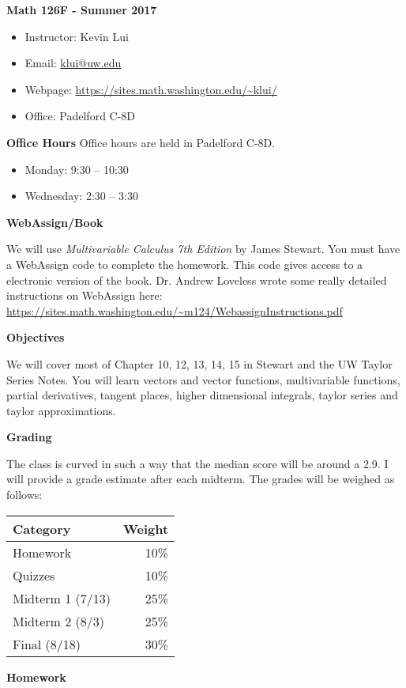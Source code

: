 \documentclass{article}
\begin{document}
\textbf{\huge  Math 126F - Summer 2017 }
\begin{itemize}
    \item
        Instructor: Kevin Lui
    \item
        Email: \href{mailto:klui@uw.edu}{klui@uw.edu}
    \item
        Webpage: \url{https://sites.math.washington.edu/~klui/}
    \item
        Office: Padelford C-8D
\end{itemize}

\textbf{Office Hours}
Office hours are held in Padelford C-8D.
\begin{itemize}
    \item
        Monday: 9:30 -- 10:30
    \item
        Wednesday: 2:30 -- 3:30
\end{itemize}

\textbf{WebAssign/Book}

We will use \textit{Multivariable Calculus 7th Edition} by James Stewart. You must
have a WebAssign code to complete the homework. This code gives access to a
electronic version of the book. Dr. Andrew Loveless wrote some really detailed
instructions on WebAssign here:
\url{https://sites.math.washington.edu/~m124/WebassignInstructions.pdf}

\textbf{Objectives}

We will cover most of Chapter 10, 12, 13, 14, 15 in Stewart and the UW Taylor
Series Notes. You will learn vectors and vector functions, multivariable
functions, partial derivatives, tangent places, higher dimensional integrals,
taylor series and taylor approximations.

\textbf{Grading}

The class is curved in such a way that the median score will be around a 2.9. I
will provide a grade estimate after each midterm.  The grades will be weighed
as follows:

\begin{tabular}{ l r }
    Category  & Weight   \\
    \hline
    Homework  & 10\%      \\
    Quizzes   & 10\%      \\
    Midterm 1 (7/13) & 25\%      \\
    Midterm 2 (8/3) & 25\%      \\
    Final (8/18)    & 30\%
\end{tabular}

\textbf{Homework}
\end{document}
